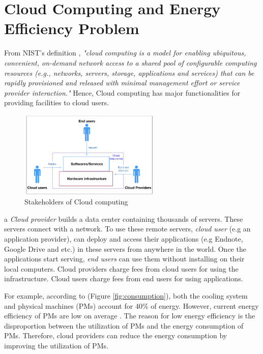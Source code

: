 \section{Cloud Computing and Energy Efficiency Problem}
\label{sec:background}


 From NIST's definition \cite{Mell:2011jj}, \textit{"cloud computing is a model for enabling ubiquitous, convenient, on-demand network access to a shared pool of configurable computing resources (e.g., networks, servers, storage, applications and services) that can be rapidly provisioned and released with minimal management effort or service provider interaction."} Hence, Cloud computing has major functionalities for providing facilities to cloud users.

\begin{figure}
	\centering
	\includegraphics[width=0.6\textwidth]{pics/stakeholders.png}
	\caption{Stakeholders of Cloud computing \cite{Jennings:2015ht}}
	\label{fig:stakeholders}
\end{figure}

 a \emph{Cloud provider} builds a data center containing thousands of servers. These servers connect with a network. 
To use these remote servers, \emph{cloud user} (e.g an application provider), can deploy and access their applications (e.g Endnote, Google Drive and etc.) in these servers from anywhere in the world. Once the applications start serving, \emph{end users} can use them without installing on their local computers. Cloud providers charge fees from cloud users for using the infrastructure. Cloud users charge fees from end users for using applications. 

 For example, according to \cite{Rong:2016js} (Figure \ref{fig:consumption}), both the cooling system and physical machines (PMs) account for 40\% of energy. However, current energy efficiency of PMs are low on average  \cite{Hameed:2016cmb}.
The reason for low energy efficiency is the disproportion between the utilization of PMs and the energy consumption of PMs.  Therefore, 
cloud providers can reduce the energy consumption by improving the utilization of PMs.


